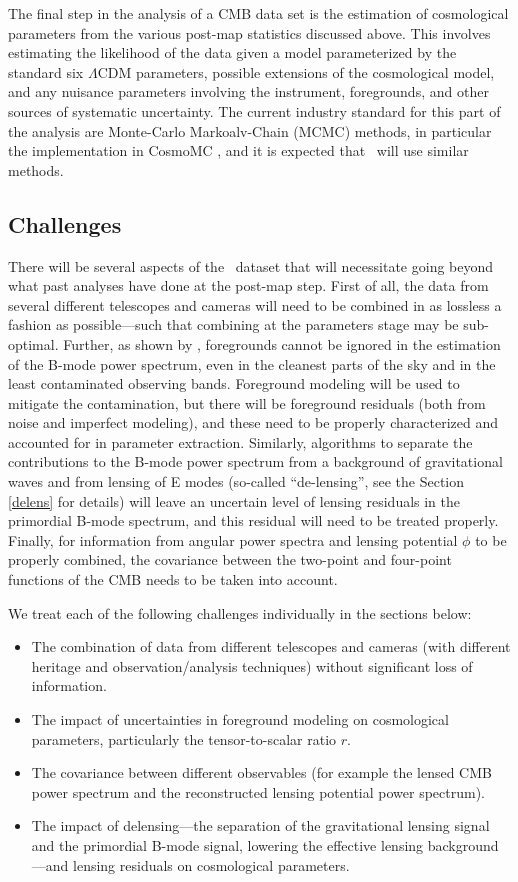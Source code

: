 The final step in the analysis of a CMB data set is the estimation of cosmological parameters from
the various post-map statistics discussed above.
This involves estimating the likelihood of the data
given a model parameterized by the standard six $\Lambda$CDM parameters, possible extensions
of the cosmological model, and any nuisance parameters involving the instrument, foregrounds, and
other sources of systematic uncertainty. The current industry standard for this part of the analysis are
Monte-Carlo Markoalv-Chain (MCMC) methods, in particular the implementation in CosmoMC
\cite{Lewis:2002ah}, and it is expected that \cmbexp\ will use similar methods. 

\subsection{Challenges}
\label{se:challenges}
There will be several 
aspects of the \cmbexp\ dataset that will necessitate going beyond what past analyses
have done at the post-map step. First of all, the data from several different telescopes and cameras will need
to be combined in as lossless a fashion as possible---such that combining at the parameters stage
may be sub-optimal.
Further, as shown by \cite{Ade:2015tva}, foregrounds cannot be ignored in the 
estimation of the B-mode power spectrum, even in the cleanest parts of the sky and in the 
least contaminated observing bands. Foreground modeling will be used to mitigate the contamination,
but there will be foreground residuals (both from noise and imperfect modeling), and these need
to be properly characterized and accounted for in parameter extraction. 
Similarly, algorithms to separate the contributions to the B-mode power spectrum from a background of gravitational
waves and from lensing of E modes (so-called ``de-lensing'', see the Section \ref{delens} for 
details) will leave an uncertain level of lensing residuals in the primordial B-mode spectrum, and
this residual will need to be treated properly. Finally, for information from angular power spectra
and lensing potential $\phi$ to be properly combined, the covariance between the two-point and
four-point functions of the CMB needs to be taken into account.

We treat each of the following challenges individually in the sections below:
\begin{itemize}
\item{The combination of data from different telescopes and cameras (with different heritage 
and observation/analysis techniques) without significant loss of information.}
\item{The impact of uncertainties in foreground modeling on cosmological parameters, particularly the tensor-to-scalar ratio $r$.}
\item{The covariance between different observables (for example the lensed CMB power spectrum and the reconstructed lensing potential power spectrum).}
\item{The impact of delensing---the separation of the gravitational lensing signal and the primordial B-mode signal, lowering the effective lensing background---and lensing residuals on cosmological parameters.} 
\end{itemize}


